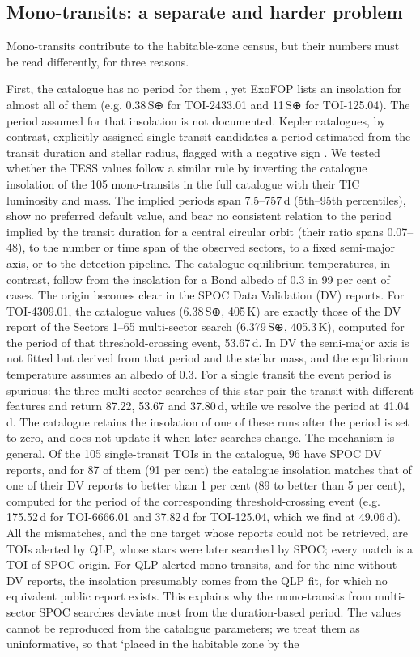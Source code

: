 \documentclass[fleqn,usenatbib]{mnras}
\begin{document}
\subsection{Mono-transits: a separate and harder problem}

Mono-transits contribute to the habitable-zone census, but their numbers must be read differently, for three reasons.

First, the catalogue has no period for them \citep{Guerrero2021}, yet ExoFOP lists an insolation for almost all of them (e.g. 0.38\,S⊕ for TOI-2433.01 and 11\,S⊕ for TOI-125.04). The period assumed for that insolation is not documented. Kepler catalogues, by contrast, explicitly assigned single-transit candidates a period estimated from the transit duration and stellar radius, flagged with a negative sign \citep{Batalha2013}. We tested whether the TESS values follow a similar rule by inverting the catalogue insolation of the 105 mono-transits in the full catalogue with their TIC luminosity and mass. The implied periods span 7.5--757\,d (5th--95th percentiles), show no preferred default value, and bear no consistent relation to the period implied by the transit duration for a central circular orbit (their ratio spans 0.07--48), to the number or time span of the observed sectors, to a fixed semi-major axis, or to the detection pipeline. The catalogue equilibrium temperatures, in contrast, follow from the insolation for a Bond albedo of 0.3 in 99 per cent of cases. The origin becomes clear in the SPOC Data Validation (DV) reports. For TOI-4309.01, the catalogue values (6.38\,S⊕, 405\,K) are exactly those of the DV report of the Sectors 1--65 multi-sector search (6.379\,S⊕, 405.3\,K), computed for the period of that threshold-crossing event, 53.67\,d. In DV the semi-major axis is not fitted but derived from that period and the stellar mass, and the equilibrium temperature assumes an albedo of 0.3. For a single transit the event period is spurious: the three multi-sector searches of this star pair the transit with different features and return 87.22, 53.67 and 37.80\,d, while we resolve the period at 41.04\,d. The catalogue retains the insolation of one of these runs after the period is set to zero, and does not update it when later searches change. The mechanism is general. Of the 105 single-transit TOIs in the catalogue, 96 have SPOC DV reports, and for 87 of them (91 per cent) the catalogue insolation matches that of one of their DV reports to better than 1 per cent (89 to better than 5 per cent), computed for the period of the corresponding threshold-crossing event (e.g. 175.52\,d for TOI-6666.01 and 37.82\,d for TOI-125.04, which we find at 49.06\,d). All the mismatches, and the one target whose reports could not be retrieved, are TOIs alerted by QLP, whose stars were later searched by SPOC; every match is a TOI of SPOC origin. For QLP-alerted mono-transits, and for the nine without DV reports, the insolation presumably comes from the QLP fit, for which no equivalent public report exists. This explains why the mono-transits from multi-sector SPOC searches deviate most from the duration-based period. The values cannot be reproduced from the catalogue parameters; we treat them as uninformative, so that `placed in the habitable zone by the 
\end{document}
